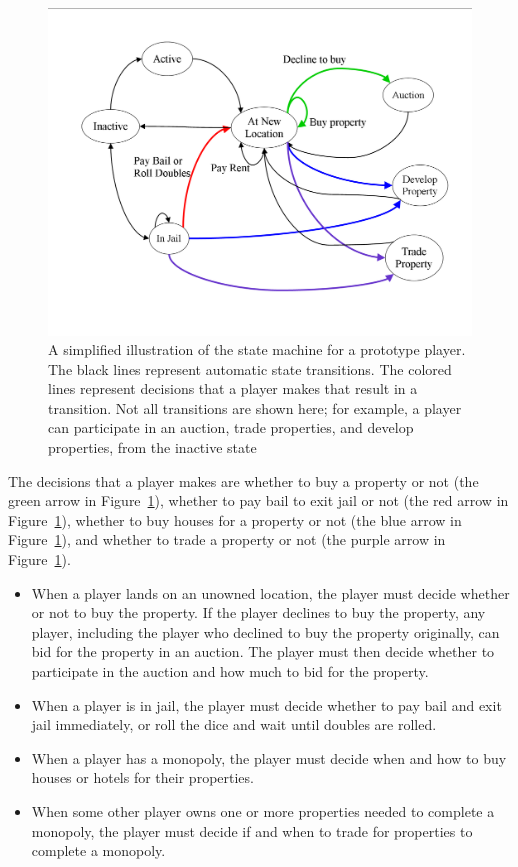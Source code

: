 \begin{figure}[htp]
\centerline{\includegraphics[width=1.0\columnwidth]{Figures/statemachine.png}}
\caption[Monopoly player state machine]{A simplified illustration of the state
machine for a prototype player. The black lines represent automatic state
transitions. The colored lines represent decisions that a player makes that
result in a transition. Not all transitions are shown here; for example, a
player can participate in an auction, trade properties, and develop properties,
from the inactive state}
\label{figure-statemachine}
\end{figure}

The decisions that a player makes are whether to buy a property or not (the
green arrow in Figure~\ref{figure-statemachine}), whether to pay bail to exit
jail or not (the red arrow in Figure~\ref{figure-statemachine}), whether to buy
houses for a property or not (the blue arrow in
Figure~\ref{figure-statemachine}), and whether to trade a property or not (the
purple arrow in Figure~\ref{figure-statemachine}).

\begin{itemize}
  \item{When a player lands on an unowned location, the player must decide
  whether or not to buy the property. If the player declines to buy the
  property, any player, including the player who declined to buy the property
  originally, can bid for the property in an auction. The player must then
  decide whether to participate in the auction and how much to bid for the property.}
  \item{When a player is in jail, the player must decide whether to pay bail and
  exit jail immediately, or roll the dice and wait until doubles are rolled.}
  \item{When a player has a monopoly, the player must decide when and how to buy
  houses or hotels for their properties.}
  \item{When some other player owns one or more properties needed to complete a
  monopoly, the player must decide if and when to trade for properties to
  complete a monopoly.}
\end{itemize}

